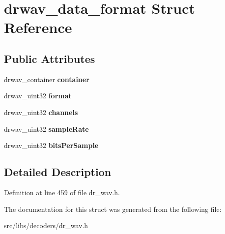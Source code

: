 \hypertarget{structdrwav__data__format}{\section{drwav\-\_\-data\-\_\-format Struct Reference}
\label{structdrwav__data__format}
}
\subsection*{Public Attributes}
\begin{DoxyCompactItemize}
\item 
\hypertarget{structdrwav__data__format_ac1973d5e81f2a89c01a67d8ed11c73f4}{drwav\-\_\-container {\bfseries container}}\label{structdrwav__data__format_ac1973d5e81f2a89c01a67d8ed11c73f4}

\item 
\hypertarget{structdrwav__data__format_abc2fcad3dcac30abe6f8a3d03591bb98}{drwav\-\_\-uint32 {\bfseries format}}\label{structdrwav__data__format_abc2fcad3dcac30abe6f8a3d03591bb98}

\item 
\hypertarget{structdrwav__data__format_a13b31399c0f47c1742ee9cfa490d6729}{drwav\-\_\-uint32 {\bfseries channels}}\label{structdrwav__data__format_a13b31399c0f47c1742ee9cfa490d6729}

\item 
\hypertarget{structdrwav__data__format_acce462278b2e0403af7fee1ff24312d9}{drwav\-\_\-uint32 {\bfseries sample\-Rate}}\label{structdrwav__data__format_acce462278b2e0403af7fee1ff24312d9}

\item 
\hypertarget{structdrwav__data__format_a07f788b46635807997eedde130fdd034}{drwav\-\_\-uint32 {\bfseries bits\-Per\-Sample}}\label{structdrwav__data__format_a07f788b46635807997eedde130fdd034}

\end{DoxyCompactItemize}


\subsection{Detailed Description}


Definition at line 459 of file dr\-\_\-wav.\-h.



The documentation for this struct was generated from the following file\-:\begin{DoxyCompactItemize}
\item 
src/libs/decoders/dr\-\_\-wav.\-h\end{DoxyCompactItemize}
